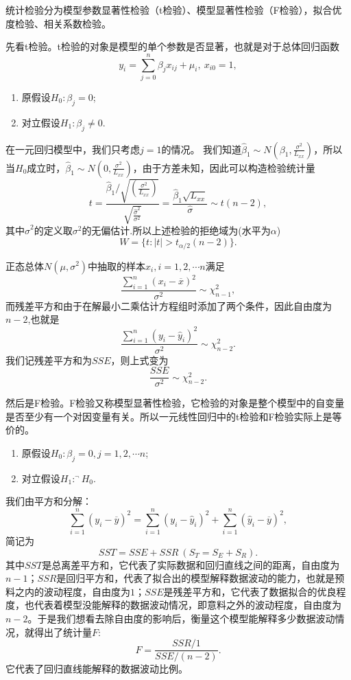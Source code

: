 \documentclass[lang=cn,10pt]{elegantbook}
\begin{document}
    统计检验分为模型参数显著性检验（t检验）、模型显著性检验（F检验），拟合优度检验、相关系数检验。

    先看t检验。t检验的对象是模型的单个参数是否显著，也就是对于总体回归函数
    \[y_i=\sum_{j=0}^{n}\beta_jx_{ij}+\mu_i,\ x_{i0}=1,\]
    \begin{enumerate}
        \item 原假设\(H_0:\beta_j=0\);
        \item 对立假设\(H_1:\beta_j\ne0\).
    \end{enumerate}
    在一元回归模型中，我们只考虑\(j=1\)的情况。
    我们知道\(\hat{\beta}_1\sim N(\beta_1,\frac{\sigma^2}{L_{xx}})\)，所以当\(H_0\)成立时，\(\hat{\beta}_1\sim N(0,\frac{\sigma^2}{L_{xx}})\)，由于方差未知，因此可以构造检验统计量
    \[t=\frac{\hat{\beta}_1/\sqrt{(\frac{\sigma^2}{L_{xx}})}}{\sqrt{\frac{\hat{\sigma}^2}{\sigma^2}}}=\frac{\hat{\beta}_1\sqrt{L_{xx}}}{\hat{\sigma}}\sim t(n-2),\]
    其中\(\hat{\sigma}^2\)的定义取\(\sigma^2\)的无偏估计.所以上述检验的拒绝域为(水平为\(\alpha\))
    \[W=\{t:|t|>t_{\alpha/2}(n-2)\}.\]
    \begin{note}
        正态总体\(N(\mu,\sigma^2)\)中抽取的样本\(x_i,i=1,2,\cdots n\)满足
        \[\frac{\sum_{i=1}^{n}(x_i-\overline{x})^2}{\sigma^2}\sim \chi^2_{n-1},\]
        而残差平方和由于在解最小二乘估计方程组时添加了两个条件，因此自由度为\(n-2\),也就是
        \[\frac{\sum_{i=1}^{n}(y_i-\hat{y}_i)^2}{\sigma^2}\sim \chi^2_{n-2}.\]
        我们记残差平方和为\(SSE\)，则上式变为
        \[\frac{SSE}{\sigma^2}\sim \chi^2_{n-2}.\]
    \end{note}

    然后是F检验。F检验又称模型显著性检验，它检验的对象是整个模型中的自变量是否至少有一个对因变量有关。所以一元线性回归中的t检验和F检验实际上是等价的。
    \begin{enumerate}
        \item 原假设\(H_0:\beta_j=0,j=1,2,\cdots n\);
        \item 对立假设\(H_1:^\neg H_0\).
    \end{enumerate}
    我们由平方和分解：
    \[\sum_{i=1}^{n}(y_i-\overline{y})^2=\sum_{i=1}^{n}(y_i-\hat{y}_i)^2+\sum_{i=1}^{n}(\hat{y}_i-\overline{y})^2,\]
    简记为
    \[SST=SSE+SSR\ (S_T=S_E+S_R).\]
    其中\(SST\)是总离差平方和，它代表了实际数据和回归直线之间的距离，自由度为\(n-1\)；\(SSR\)是回归平方和，代表了拟合出的模型解释数据波动的能力，也就是预料之内的波动程度，自由度为\(1\)；\(SSE\)是残差平方和，它代表了数据拟合的优良程度，也代表着模型没能解释的数据波动情况，即意料之外的波动程度，自由度为\(n-2\)。于是我们想看去除自由度的影响后，衡量这个模型能解释多少数据波动情况，就得出了统计量\(F\):
    \[F=\frac{SSR/1}{SSE/(n-2)}.\]
    它代表了回归直线能解释的数据波动比例。
\end{document}
